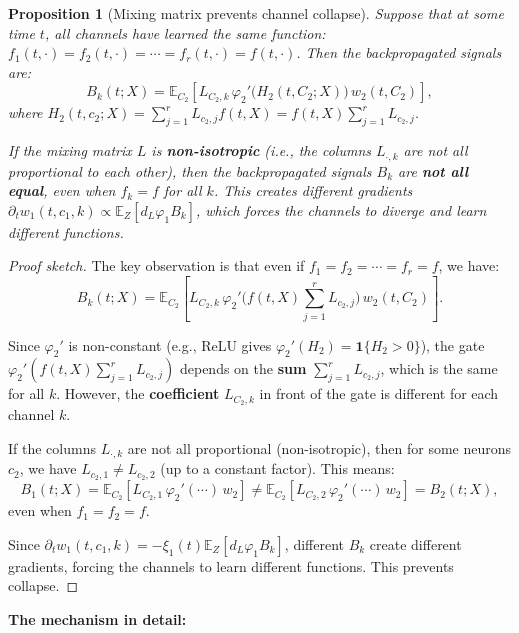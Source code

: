 \documentclass[11pt]{article}
\newcommand{\E}{\mathbb{E}}
\newcommand{\1}{\mathbbm{1}}
\newtheorem{proposition}{Proposition}
\begin{document}
\begin{proposition}[Mixing matrix prevents channel collapse]
\label{prop:no-collapse}
Suppose that at some time $t$, all channels have learned the same function: $f_1(t,\cdot) = f_2(t,\cdot) = \cdots = f_r(t,\cdot) = f(t,\cdot)$. Then the backpropagated signals are:
\[
B_k(t; X) = \E_{C_2}\!\left[L_{C_2,k}\,\varphi_2'\!\Big(H_2(t, C_2; X)\Big)\,w_2(t, C_2)\right],
\]
where $H_2(t, c_2; X) = \sum_{j=1}^r L_{c_2,j} f(t, X) = f(t, X) \sum_{j=1}^r L_{c_2,j}$.

If the mixing matrix $L$ is \textbf{non-isotropic} (i.e., the columns $L_{\cdot,k}$ are not all proportional to each other), then the backpropagated signals $B_k$ are \textbf{not all equal}, even when $f_k = f$ for all $k$. This creates different gradients $\partial_t w_1(t, c_1, k) \propto \E_Z[d_L \varphi_1 B_k]$, which forces the channels to diverge and learn different functions.
\end{proposition}

\begin{proof}[Proof sketch]
The key observation is that even if $f_1 = f_2 = \cdots = f_r = f$, we have:
\[
B_k(t; X) = \E_{C_2}\!\left[L_{C_2,k}\,\varphi_2'\!\Big(f(t, X) \sum_{j=1}^r L_{c_2,j}\Big)\,w_2(t, C_2)\right].
\]

Since $\varphi_2'$ is non-constant (e.g., ReLU gives $\varphi_2'(H_2) = \mathbf{1}\{H_2 > 0\}$), the gate $\varphi_2'(f(t, X) \sum_{j=1}^r L_{c_2,j})$ depends on the \textbf{sum} $\sum_{j=1}^r L_{c_2,j}$, which is the same for all $k$. However, the \textbf{coefficient} $L_{C_2,k}$ in front of the gate is different for each channel $k$.

If the columns $L_{\cdot,k}$ are not all proportional (non-isotropic), then for some neurons $c_2$, we have $L_{c_2,1} \ne L_{c_2,2}$ (up to a constant factor). This means:
\[
B_1(t; X) = \E_{C_2}\!\left[L_{C_2,1}\,\varphi_2'(\cdots)\,w_2\right] \ne \E_{C_2}\!\left[L_{C_2,2}\,\varphi_2'(\cdots)\,w_2\right] = B_2(t; X),
\]
even when $f_1 = f_2 = f$.

Since $\partial_t w_1(t, c_1, k) = -\xi_1(t) \E_Z[d_L \varphi_1 B_k]$, different $B_k$ create different gradients, forcing the channels to learn different functions. This prevents collapse.
\end{proof}

\textbf{The mechanism in detail:}
\end{document}
